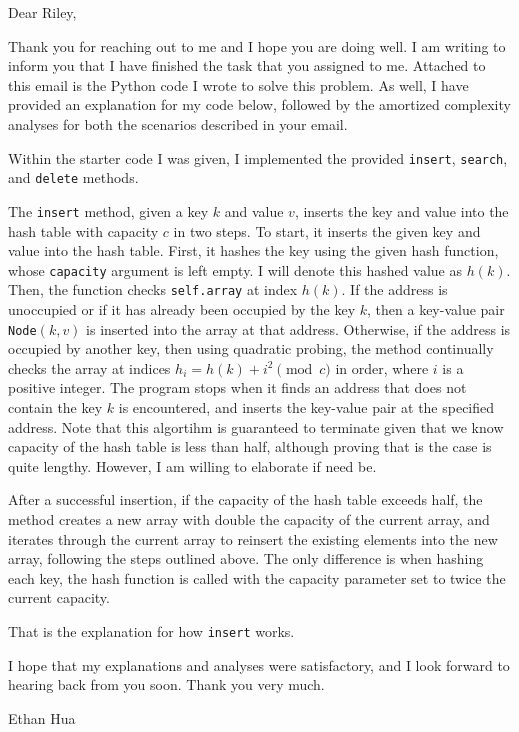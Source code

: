 \documentclass[11pt]{article}
\begin{document}
    Dear Riley,

    \medskip

    Thank you for reaching out to me and I hope you are doing well. I am writing to inform you that I have finished the task that you assigned to me. Attached to this email is the Python code I wrote to solve this problem. As well, I have provided an explanation for my code below, followed by the amortized complexity analyses for both the scenarios described in your email.

    Within the starter code I was given, I implemented the provided \texttt{insert}, \texttt{search}, and \texttt{delete} methods.

    The \texttt{insert} method, given a key \(k\) and value \(v\), inserts the key and value into the hash table with capacity \(c\) in two steps. To start, it inserts the given key and value into the hash table. First, it hashes the key using the given hash function, whose \texttt{capacity} argument is left empty. I will denote this hashed value as \(h(k)\). Then, the function checks \texttt{self.array} at index \(h(k)\). If the address is unoccupied or if it has already been occupied by the key \(k\), then a key-value pair \texttt{Node}\((k,v)\) is inserted into the array at that address. Otherwise, if the address is occupied by another key, then using quadratic probing, the method continually checks the array at indices \(h_i = h(k) + i^2 \pmod c\) in order, where \(i\) is a positive integer. The program stops when it finds an address that does not contain the key \(k\) is encountered, and inserts the key-value pair at the specified address. Note that this algortihm is guaranteed to terminate given that we know capacity of the hash table is less than half, although proving that is the case is quite lengthy. However, I am willing to elaborate if need be.

    After a successful insertion, if the capacity of the hash table exceeds half, the method creates a new array with double the capacity of the current array, and iterates through the current array to reinsert the existing elements into the new array, following the steps outlined above. The only difference is when hashing each key, the hash function is called with the capacity parameter set to twice the current capacity.

    That is the explanation for how \texttt{insert} works.
    
    I hope that my explanations and analyses were satisfactory, and I look forward to hearing back from you soon. Thank you very much.

    \medskip

    Ethan Hua
\end{document}
